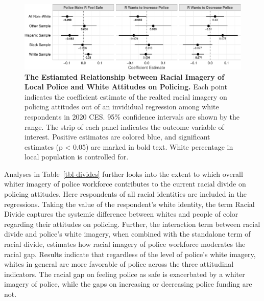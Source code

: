 \documentclass[
  12pt,
]{article}
\begin{document}
\begin{figure}[tb]

{\centering \includegraphics{racialized-police_files/figure-pdf/fig-baseline-1.pdf}

}

\caption{\label{fig-baseline}\textbf{The Estiamted Relationship between
Racial Imagery of Local Police and White Attitudes on Policing.} Each
point indicates the coefficient estimate of the realted racial imagery
on policing attitudes out of an invididual regression among white
respondents in 2020 CES. 95\% confidence intervals are shown by the
range. The strip of each panel indicates the outcome variable of
interest. Positive estimates are colored blue, and significant estimates
(p \textless{} 0.05) are marked in bold text. White percentage in local
population is controlled for.}

\end{figure}

Analyses in Table~\ref{tbl-divides} further looks into the extent to
which overall whiter imagery of police workforce contributes to the
current racial divide on policing attitudes. Here respondents of all
racial identities are included in the regressions. Taking the value of
the respondent's white identity, the term Racial Divide captures the
systemic difference between whites and people of color regarding their
attitudes on policing. Further, the interaction term between racial
divide and police's white imagery, when combined with the standalone
term of racial divide, estimates how racial imagery of police workforce
moderates the racial gap. Results indicate that regardless of the level
of police's white imagery, whites in general are more favorable of
police across the three attitudinal indicators. The racial gap on
feeling police as safe is exacerbated by a whiter imagery of police,
while the gaps on increasing or decreasing police funding are not.
\end{document}
